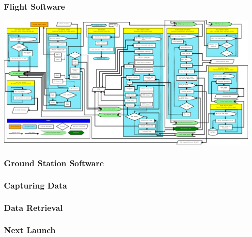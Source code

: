 \documentclass[landscape,xcolor={table}]{beamer}
\begin{document}
\begin{frame}
\begin{columns}[T]
\begin{column}{.30\textwidth}
		\end{column}%
		\end{columns}
			

	\end{frame}
	
	\begin{frame}
		
		\frametitle{Flight Software}
		
		\includegraphics[width=\textwidth]{images/mfsw_block}

	\end{frame}
	
	\begin{frame}
		
		\frametitle{Ground Station Software}

	\end{frame}
	
	\begin{frame}
		
		\frametitle{Capturing Data}

	\end{frame}
	
	\begin{frame}
		
		\frametitle{Data Retrieval}

	\end{frame}
	
	\begin{frame}
		
		\frametitle{Next Launch}

	\end{frame}
	
\end{document}
